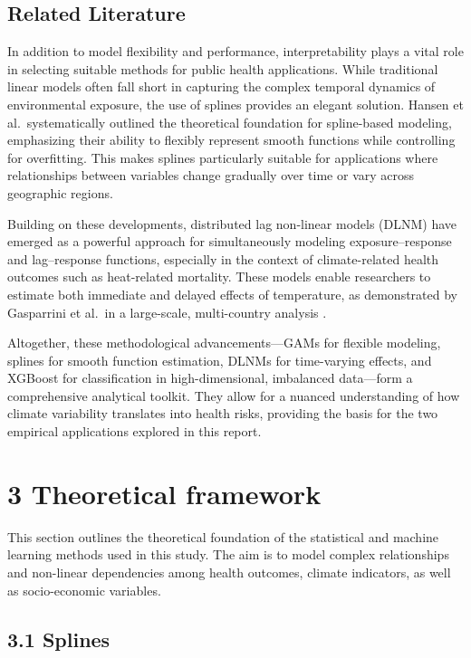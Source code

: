 \documentclass[
]{krantz}
\begin{document}
\subsection{Related Literature}\label{related-literature}

In addition to model flexibility and performance, interpretability plays a vital role in selecting suitable methods for public health applications. While traditional linear models often fall short in capturing the complex temporal dynamics of environmental exposure, the use of splines provides an elegant solution. Hansen et al.~systematically outlined the theoretical foundation for spline-based modeling, emphasizing their ability to flexibly represent smooth functions while controlling for overfitting. This makes splines particularly suitable for applications where relationships between variables change gradually over time or vary across geographic regions.\citep{hansen2006}

Building on these developments, distributed lag non-linear models (DLNM) have emerged as a powerful approach for simultaneously modeling exposure--response and lag--response functions, especially in the context of climate-related health outcomes such as heat-related mortality. These models enable researchers to estimate both immediate and delayed effects of temperature, as demonstrated by Gasparrini et al.~in a large-scale, multi-country analysis \citep{gasparrini2015}.

Altogether, these methodological advancements---GAMs for flexible modeling, splines for smooth function estimation, DLNMs for time-varying effects, and XGBoost for classification in high-dimensional, imbalanced data---form a comprehensive analytical toolkit. They allow for a nuanced understanding of how climate variability translates into health risks, providing the basis for the two empirical applications explored in this report.

\section{3 Theoretical framework}\label{theoretical-framework}

This section outlines the theoretical foundation of the statistical and machine learning methods used in this study. The aim is to model complex relationships and non-linear dependencies among health outcomes, climate indicators, as well as socio-economic variables.

\subsection{3.1 Splines}\label{splines}
\end{document}
